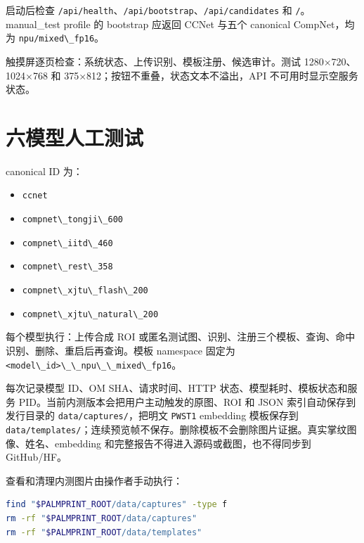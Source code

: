 启动后检查
\passthrough{\lstinline!/api/health!}、\passthrough{\lstinline!/api/bootstrap!}、\passthrough{\lstinline!/api/candidates!}
和 \passthrough{\lstinline!/!}。manual\_test profile 的 bootstrap 应返回
CCNet 与五个 canonical CompNet，均为
\passthrough{\lstinline!npu/mixed\_fp16!}。

触摸屏逐页检查：系统状态、上传识别、模板注册、候选审计。测试
1280×720、1024×768 和 375×812；按钮不重叠，状态文本不溢出，API
不可用时显示空服务状态。

\section{六模型人工测试}\label{ux516dux6a21ux578bux4ebaux5de5ux6d4bux8bd5}

canonical ID 为：

\begin{itemize}
\tightlist
\item
  \passthrough{\lstinline!ccnet!}
\item
  \passthrough{\lstinline!compnet\_tongji\_600!}
\item
  \passthrough{\lstinline!compnet\_iitd\_460!}
\item
  \passthrough{\lstinline!compnet\_rest\_358!}
\item
  \passthrough{\lstinline!compnet\_xjtu\_flash\_200!}
\item
  \passthrough{\lstinline!compnet\_xjtu\_natural\_200!}
\end{itemize}

每个模型执行：上传合成 ROI
或匿名测试图、识别、注册三个模板、查询、命中识别、删除、重启后再查询。模板
namespace 固定为
\passthrough{\lstinline!<model\_id>\_\_npu\_\_mixed\_fp16!}。

每次记录模型 ID、OM SHA、请求时间、HTTP 状态、模型耗时、模板状态和服务
PID。当前内测版本会把用户主动触发的原图、ROI 和 JSON
索引自动保存到发行目录的
\passthrough{\lstinline!data/captures/!}，把明文
\passthrough{\lstinline!PWST1!} embedding 模板保存到
\passthrough{\lstinline!data/templates/!}；连续预览帧不保存。删除模板不会删除图片证据。真实掌纹图像、姓名、embedding
和完整报告不得进入源码或截图，也不得同步到 GitHub/HF。

查看和清理内测图片由操作者手动执行：

\begin{lstlisting}[language=bash]
find "$PALMPRINT_ROOT/data/captures" -type f
rm -rf "$PALMPRINT_ROOT/data/captures"
rm -rf "$PALMPRINT_ROOT/data/templates"
\end{lstlisting}

